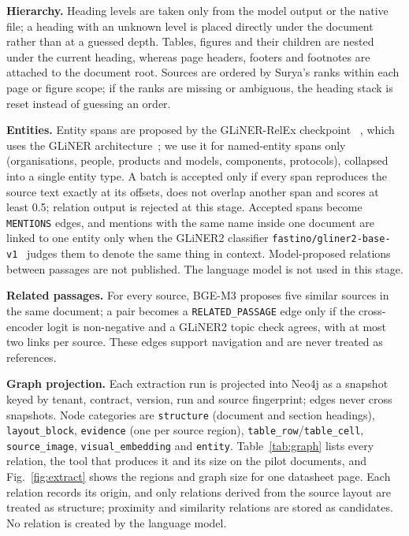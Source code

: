 \documentclass[runningheads]{llncs}
\begin{document}
\textbf{Hierarchy.} Heading levels are taken only from the model output or the native file; a heading with an unknown level is placed directly under the document rather than at a guessed depth. Tables, figures and their children are nested under the current heading, whereas page headers, footers and footnotes are attached to the document root. Sources are ordered by Surya's ranks within each page or figure scope; if the ranks are missing or ambiguous, the heading stack is reset instead of guessing an order.

\textbf{Entities.} Entity spans are proposed by the GLiNER-RelEx checkpoint ~\cite{knowledgator2025relex}, which uses the GLiNER architecture~\cite{zaratiana2024gliner}; we use it for named-entity spans only (organisations, people, products and models, components, protocols), collapsed into a single entity type. A batch is accepted only if every span reproduces the source text exactly at its offsets, does not overlap another span and scores at least 0.5; relation output is rejected at this stage. Accepted spans become \texttt{MENTIONS} edges, and mentions with the same name inside one document are linked to one entity only when the GLiNER2 classifier \texttt{fastino/gliner2-base-v1}~\cite{zaratiana2025gliner2} judges them to denote the same thing in context. Model-proposed relations between passages are not published. The language model is not used in this stage.

\textbf{Related passages.} For every source, BGE-M3 proposes five similar sources in the same document; a pair becomes a \texttt{RELATED\_PASSAGE} edge only if the cross-encoder logit is non-negative and a GLiNER2 topic check agrees, with at most two links per source. These edges support navigation and are never treated as references.

\textbf{Graph projection.} Each extraction run is projected into Neo4j as a snapshot keyed by tenant, contract, version, run and source fingerprint; edges never cross snapshots. Node categories are \texttt{structure} (document and section headings), \texttt{layout\_block}, \texttt{evidence} (one per source region), \texttt{table\_row}/\texttt{table\_cell}, \texttt{source\_image}, \texttt{visual\_embedding} and \texttt{entity}. Table~\ref{tab:graph} lists every relation, the tool that produces it and its size on the pilot documents, and Fig.~\ref{fig:extract} shows the regions and graph size for one datasheet page. Each relation records its origin, and only relations derived from the source layout are treated as structure; proximity and similarity relations are stored as candidates. No relation is created by the language model.
\end{document}
